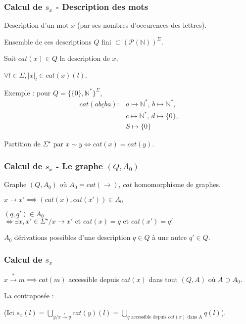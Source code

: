 \documentclass[12pt]{beamer}
\newcommand{\norm}[1]{\lvert #1 \rvert}
\begin{document}
\begin{frame}\frametitle{Calcul de $s_x$ - Description des mots}
Description d'un mot $x$ (par ses nombres d'occurences des lettres).

Ensemble de ces descriptions
$Q$ fini $ \subset ({\mathcal{P}(\mathbb{N})})^{\Sigma}$.

Soit $cat(x) \in Q$ la description de $x$,

$\forall l \in \Sigma, \norm{x}_l \in cat(x)(l)$.
\pause

Exemple : pour $Q = \{\{0\},\mathbb{N}^*\}^\Sigma$,
\begin{align*}
cat(\underline{ abcba }) : & a \mapsto \mathbb{N}^*\text{, }b \mapsto \mathbb{N}^*\text{,}\\
&c \mapsto \mathbb{N}^*\text{, }d \mapsto \{0\}\text{,}\\
&S \mapsto \{0\}
\end{align*}
\pause

Partition de $\Sigma^\star$ par $x \sim y \iff cat(x) = cat(y)$.
\end{frame}

\begin{frame}\frametitle{Calcul de $s_x$ - Le graphe $(Q,A_0)$}
Graphe $(Q,A_0)$ où $A_0 = cat(\rightarrow)$, $cat$ homomorphisme de graphes.

$x \rightarrow x' \implies (cat(x),cat(x')) \in A_0$
\pause

$(q,q') \in A_0$\\ 
$\iff \exists x,x' \in \Sigma^\star / x \rightarrow x' \text{ et } cat(x) = q \text{ et } cat(x') = q'$

$A_0$ dérivations possibles d'une description $q \in Q$ à une autre $q' \in Q$.
\end{frame}
\begin{frame}\frametitle{Calcul de $s_x$}
$x \overset{*}{\rightarrow} m \implies cat(m)$ accessible depuis $cat(x)$ dans tout $(Q,A)$ où $A \supset A_0$.
\pause

La contraposée :
\pause

(Ici $s_x(l) = \bigcup_{y / x\overset{*}{\rightarrow} y} cat(y)(l) = \bigcup_{q\text{ accessible depuis } cat(x) \text{ dans A}}q(l)$).

\end{frame}
\end{document}

